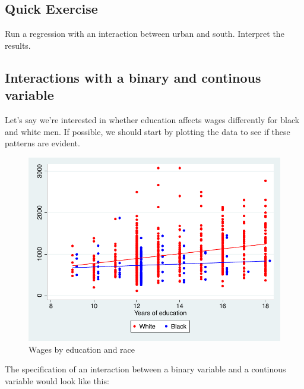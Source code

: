 \documentclass[12pt]{article}
\begin{document}
\subsection{Quick Exercise}

Run a regression with an interaction between urban and
south. Interpret the results.

\subsection{Interactions with a binary and continous variable}
\label{sec:inter-with-binary}

Let's say we're interested in whether education affects wages
differently for black and white men.  If possible, we should start by
plotting the data to see if these patterns are evident. 



\begin{figure}[h!]
  \centering
  \caption{Wages by education and race}
  \includegraphics{interact1}
\end{figure}


The specification of an
interaction between a binary variable and a continous variable would
look like this:
\end{document}
